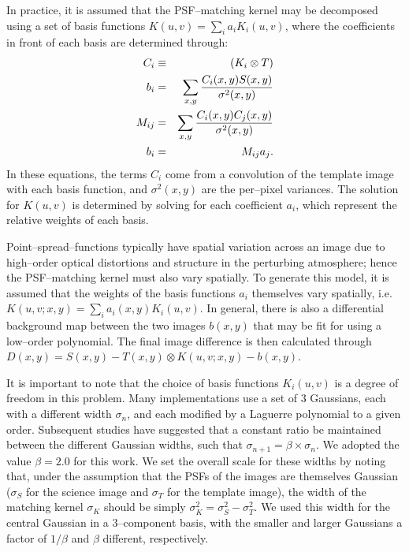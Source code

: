 \documentclass[iop]{emulateapj}
\begin{document}
In practice, it is assumed that the PSF--matching kernel may be decomposed using a set of basis functions $K(u,v) = \sum_i a_i K_i(u,v)$, where the coefficients in front of each basis are determined through:
\begin{eqnarray}
\label{eq-soln}
C_i & \equiv & (K_i \otimes T) \\ 
b_{i}  & = & \sum_{x,y} {{C_i(x,y) S(x,y)}\over{\sigma^2(x,y)}}   \nonumber \\
M_{ij} & = & \sum_{x,y} {{C_i(x,y) C_j(x,y)}\over{\sigma^2(x,y)}}  \nonumber \\
b_{i}  & = & M_{ij} a_{j}. \nonumber
\end{eqnarray}
In these equations, the terms $C_i$ come from a convolution of the template image with each basis function, and $\sigma^2(x,y)$ are the per--pixel variances.
The solution for $K(u,v)$ is determined by solving for each coefficient $a_i$, which represent the relative weights of each basis.

Point--spread--functions typically have spatial variation across an image due to high--order optical distortions and structure in the perturbing atmosphere; hence the PSF--matching kernel must also vary spatially.
To generate this model, it is assumed that the weights of the basis functions $a_i$ themselves vary spatially, i.e. $K(u,v;x,y) = \sum_i a_i(x,y) K_i(u,v)$.
In general, there is also a differential background map between the two images $b(x,y)$ that may be fit for using a low--order polynomial.
The final image difference is then calculated through $D(x,y) = S(x,y) - T(x,y) \otimes K(u,v;x,y) - b(x,y)$.

It is important to note that the choice of basis functions $K_i(u,v)$ is a degree of freedom in this problem.
Many implementations \citep{Alard98,Alard00} use a set of 3 Gaussians, each with a different width $\sigma_n$, and each modified by a Laguerre polynomial to a given order.
Subsequent studies \citep[e.g.][]{2007AN....328...16I} have suggested that a constant ratio be maintained between the different Gaussian widths, such that $\sigma_{n+1} = \beta \times \sigma_{n}$.
We adopted the value $\beta = 2.0$ for this work.
We set the overall scale for these widths by noting that, under the assumption that the PSFs of the images are themselves Gaussian ($\sigma_S$ for the science image and $\sigma_T$ for the template image), the width of the matching kernel $\sigma_K$ should be simply $\sigma_K^2 = \sigma_S^2 - \sigma_T^2$.
We used this width for the central Gaussian in a 3--component basis, with the smaller and larger Gaussians a factor of $1/\beta$ and $\beta$ different, respectively.
\end{document}
